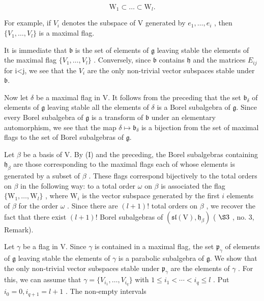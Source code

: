 \[
\mathrm{W} _ {1} \subset \dots \subset \mathrm{W} _ {l}.
\]

For example, if \(V_{i}\) denotes the subspace of V generated by \(e_{1},\ldots,e_{i}\) , then \(\{V_{1},\ldots,V_{l}\}\) is a maximal flag.

It is immediate that \(\mathfrak{b}\) is the set of elements of \(\mathfrak{g}\) leaving stable the elements of the maximal flag \(\{V_{1},\ldots,V_{l}\}\) . Conversely, since \(\mathfrak{b}\) contains \(\mathfrak{h}\) and the matrices \(E_{ij}\) for i\textless j, we see that the \(V_{i}\) are the only non-trivial vector subspaces stable under \(\mathfrak{b}\).

Now let \(\delta\) be a maximal flag in V. It follows from the preceding that the set \(\mathfrak{b}_{\delta}\) of elements of \(\mathfrak{g}\) leaving stable all the elements of \(\delta\) is a Borel subalgebra of \(\mathfrak{g}\). Since every Borel subalgebra of \(\mathfrak{g}\) is a transform of \(\mathfrak{b}\) under an elementary automorphism, we see that the map \(\delta \mapsto \mathfrak{b}_{\delta}\) is a bijection from the set of maximal flags to the set of Borel subalgebras of \(\mathfrak{g}\).

Let \(\beta\) be a basis of V. By (I) and the preceding, the Borel subalgebras containing \(\mathfrak{h}_{\beta}\) are those corresponding to the maximal flags each of whose elements is generated by a subset of \(\beta\) . These flags correspond bijectively to the total orders on \(\beta\) in the following way: to a total order \(\omega\) on \(\beta\) is associated the flag \(\{\mathrm{W}_1,\dots ,\mathrm{W}_l\}\) , where \(\mathrm{W}_i\) is the vector subspace generated by the first \(i\) elements of \(\beta\) for the order \(\omega\) . Since there are \((l + 1)!\) total orders on \(\beta\) , we recover the fact that there exist \((l + 1)!\) Borel subalgebras of \((\mathfrak{sl}(\mathrm{V}),\mathfrak{h}_{\beta})\) ( \(\S 3\) , no. 3, Remark).

Let \(\gamma\) be a flag in V. Since \(\gamma\) is contained in a maximal flag, the set \(\mathfrak{p}_{\gamma}\) of elements of \(\mathfrak{g}\) leaving stable the elements of \(\gamma\) is a parabolic subalgebra of \(\mathfrak{g}\). We show that the only non-trivial vector subspaces stable under \(\mathfrak{p}_{\gamma}\) are the elements of \(\gamma\) . For this, we can assume that \(\gamma = \{V_{i_1}, \ldots, V_{i_q}\}\) with \(1 \leq i_1 < \cdots < i_q \leq l\) . Put \(i_0 = 0, i_{q+1} = l + 1\) . The non-empty intervals

